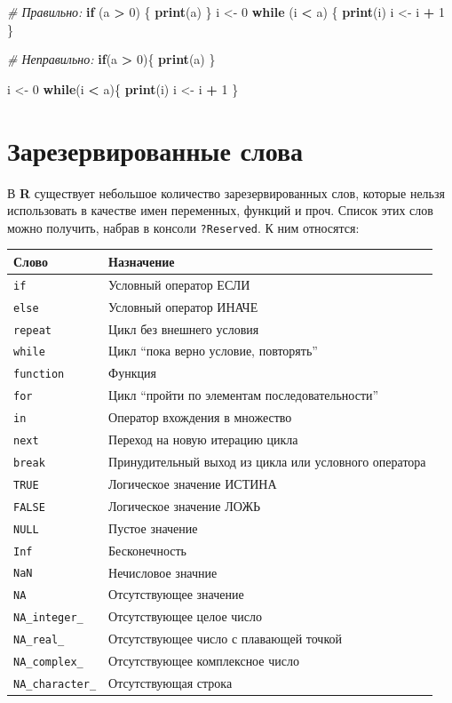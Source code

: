 \documentclass[]{book}
\newenvironment{Shaded}{\begin{snugshade}}{\end{snugshade}}
\newcommand{\KeywordTok}[1]{\textcolor[rgb]{0.13,0.29,0.53}{\textbf{#1}}}
\newcommand{\DecValTok}[1]{\textcolor[rgb]{0.00,0.00,0.81}{#1}}
\newcommand{\StringTok}[1]{\textcolor[rgb]{0.31,0.60,0.02}{#1}}
\newcommand{\CommentTok}[1]{\textcolor[rgb]{0.56,0.35,0.01}{\textit{#1}}}
\newcommand{\ControlFlowTok}[1]{\textcolor[rgb]{0.13,0.29,0.53}{\textbf{#1}}}
\newcommand{\OperatorTok}[1]{\textcolor[rgb]{0.81,0.36,0.00}{\textbf{#1}}}
\newcommand{\NormalTok}[1]{#1}
\begin{document}
\begin{Shaded}
\begin{Highlighting}[]
\CommentTok{# Правильно:}
\ControlFlowTok{if}\NormalTok{ (a }\OperatorTok{>}\StringTok{ }\DecValTok{0}\NormalTok{) \{}
  \KeywordTok{print}\NormalTok{(a)}
\NormalTok{\}}
\NormalTok{i <-}\StringTok{ }\DecValTok{0}
\ControlFlowTok{while}\NormalTok{ (i }\OperatorTok{<}\StringTok{ }\NormalTok{a) \{}
  \KeywordTok{print}\NormalTok{(i)}
\NormalTok{  i <-}\StringTok{ }\NormalTok{i }\OperatorTok{+}\StringTok{ }\DecValTok{1}
\NormalTok{\}}

\CommentTok{# Неправильно:}
\ControlFlowTok{if}\NormalTok{(a }\OperatorTok{>}\StringTok{ }\DecValTok{0}\NormalTok{)\{}
  \KeywordTok{print}\NormalTok{(a)}
\NormalTok{\}}

\NormalTok{i <-}\StringTok{ }\DecValTok{0}
\ControlFlowTok{while}\NormalTok{(i }\OperatorTok{<}\StringTok{ }\NormalTok{a)\{}
  \KeywordTok{print}\NormalTok{(i)}
\NormalTok{  i <-}\StringTok{ }\NormalTok{i }\OperatorTok{+}\StringTok{ }\DecValTok{1}
\NormalTok{\}}
\end{Highlighting}
\end{Shaded}

\section*{Зарезервированные слова}\label{-}

В \textbf{R} существует небольшое количество зарезервированных слов,
которые нельзя использовать в качестве имен переменных, функций и проч.
Список этих слов можно получить, набрав в консоли \texttt{?Reserved}. К
ним относятся:

\begin{longtable}[]{@{}ll@{}}
\toprule
Слово & Назначение\tabularnewline
\midrule
\endhead
\texttt{if} & Условный оператор ЕСЛИ\tabularnewline
\texttt{else} & Условный оператор ИНАЧЕ\tabularnewline
\texttt{repeat} & Цикл без внешнего условия\tabularnewline
\texttt{while} & Цикл ``пока верно условие, повторять''\tabularnewline
\texttt{function} & Функция\tabularnewline
\texttt{for} & Цикл ``пройти по элементам
последовательности''\tabularnewline
\texttt{in} & Оператор вхождения в множество\tabularnewline
\texttt{next} & Переход на новую итерацию цикла\tabularnewline
\texttt{break} & Принудительный выход из цикла или условного
оператора\tabularnewline
\texttt{TRUE} & Логическое значение ИСТИНА\tabularnewline
\texttt{FALSE} & Логическое значение ЛОЖЬ\tabularnewline
\texttt{NULL} & Пустое значение\tabularnewline
\texttt{Inf} & Бесконечность\tabularnewline
\texttt{NaN} & Нечисловое значние\tabularnewline
\texttt{NA} & Отсутствующее значение\tabularnewline
\texttt{NA\_integer\_} & Отсутствующее целое число\tabularnewline
\texttt{NA\_real\_} & Отсутствующее число с плавающей
точкой\tabularnewline
\texttt{NA\_complex\_} & Отсутствующее комплексное число\tabularnewline
\texttt{NA\_character\_} & Отсутствующая строка\tabularnewline
\bottomrule
\end{longtable}
\end{document}
